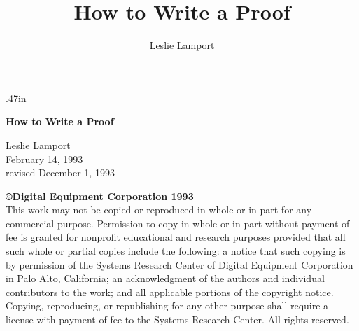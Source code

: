    \topmargin       .47in    %
   \headheight        0pt    %
   \headsep           0pt    %
   \footheight       12pt  %
   \footskip        1.5cm    %


\newcommand{\N}{{\bf N}}
\newcommand{\Q}{{\bf Q}}
\newcommand{\Z}{{\bf Z}}

\newcommand{\deq}{\mathrel{\stackrel{\scriptscriptstyle\Delta}{=}}}

\makefcn{\mylevelsep}{.3em}{{.3em}{.1em}{0pt}}
\renewcommand{\stepsep}{\mylevelsep{\pfLevelCount}}


\title{How to Write a Proof}
\author{Leslie Lamport}
\date{\moddate}



\thispagestyle{empty}
\vspace*{2.23cm}

\noindent
{\Large \bf How to Write a Proof}

\vspace{.5cm}

{\large
\noindent
Leslie Lamport\\[.25cm]
February 14, 1993\\[\jot]
revised December 1, 1993}


\cleardoublepage

\mbox{}

\vfill

\noindent
{\bf \copyright Digital Equipment Corporation 1993}\\[\baselineskip]
This work may not be copied or reproduced in whole or in part for 
any commercial purpose. Permission to copy in whole or in part
without payment of fee is granted for nonprofit educational and
research purposes provided that all such whole or partial copies
include the following: a notice that such copying is by permission
of the Systems Research Center of Digital Equipment Corporation
in Palo Alto, California; an acknowledgment of the authors and
individual contributors to the work; and all applicable portions
of the copyright notice. Copying, reproducing, or republishing for
any other purpose shall require a license with payment of fee to
the Systems Research Center. All rights reserved.

